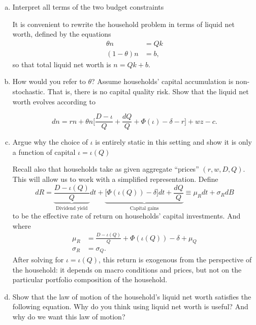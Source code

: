 \documentclass[11pt]{extarticle}
\theoremstyle{plain}
\theoremstyle{definition}
\begin{document}
\begin{enumerate}[(a)]
 \item Interpret all terms of the two budget constraints


 It is convenient to rewrite the household problem in terms of liquid net worth, defined by the equations 
\begin{align*}
	\theta n &= Q k \\
	(1-\theta) n &= b,
\end{align*}
so that total liquid net worth is $n = Qk + b$.

\item How would you refer to $\theta$? Assume households' capital accumulation is non-stochastic. That is, there is no capital quality risk. Show that the liquid net worth evolves according to 

\begin{equation*}
	dn = rn +  \theta n \bigg[ \frac{D - \iota }{Q} +  \frac{dQ}{Q} + \Phi(\iota) - \delta - r \bigg]  + w z - c .
\end{equation*}
 


\item Argue why the choice of $\iota$ is entirely static in this setting and show it is only a function of capital $\iota = \iota(Q)$ 



  Recall also that households take as given aggregate ``prices'' $(r, w, D, Q)$.  This will allow us to work with a simplified representation. Define 
\begin{equation*}
	dR = \underbrace{\frac{D - \iota (Q) }{Q}}_\text{Dividend yield} dt + \underbrace{\Big[\Phi(\iota(Q)) - \delta \Big] dt +  \frac{dQ}{Q}}_\text{Capital gains} \equiv \mu_R dt + \sigma_R dB
\end{equation*}
to be the effective rate of return on households' capital investments. And where
\begin{align*}
	\mu_R &= \frac{D - \iota (Q) }{Q}  + \Phi(\iota(Q)) - \delta + \mu_Q \\
	\sigma_R &= \sigma_Q. 
\end{align*}
After solving for $\iota = \iota(Q)$, this return is exogenous from the perspective of the household: it depends on macro conditions and prices, but not on the particular portfolio composition of the household.

\item Show that the law of motion of the household's liquid net worth satisfies the following equation. Why do you think using liquid net worth is useful? And why do we want this law of motion?


\end{enumerate}
\end{document}
